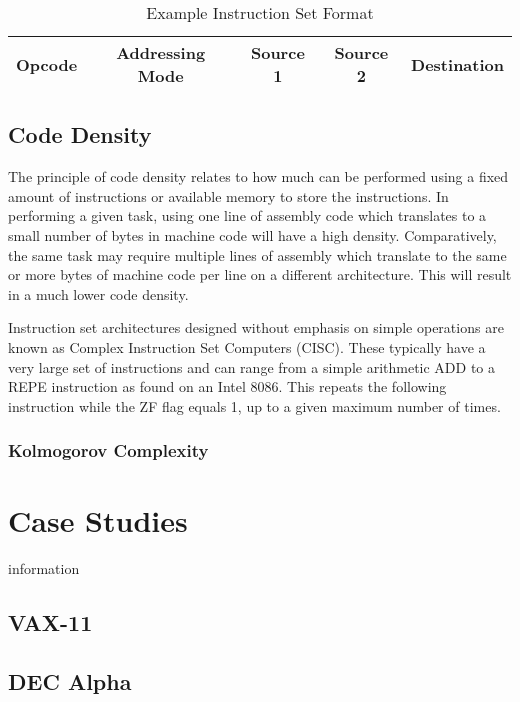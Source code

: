 \documentclass[12pt,a4paper]{article}
\begin{document}


\begin{table}[h]
\centering
\begin{tabular}{|c|c|c|c|c|}
\hline Opcode & Addressing Mode & Source 1 & Source 2 & Destination \\ \hline
\end{tabular}
\caption{\label{tab:ExFormat}Example Instruction Set Format}
\end{table}

\subsection{Code Density}
The principle of code density relates to how much can be performed using a fixed amount of instructions or available memory to store the instructions. In performing a given task, using one line of assembly code which translates to a small number of bytes in machine code will have a high density. Comparatively, the same task may require multiple lines of assembly which translate to the same or more bytes of machine code per line on a different architecture. This will result in a much lower code density. 

Instruction set architectures designed without emphasis on simple operations are known as Complex Instruction Set Computers (CISC). These typically have a very large set of instructions and can range from a simple arithmetic ADD %
to a REPE %
 instruction as found on an Intel 8086. \cite{8086:InstructionSet} 
 This repeats the following instruction while the ZF flag equals 1, up to a given maximum number of times. 

\subsubsection{Kolmogorov Complexity}

\section{Case Studies}
information

\subsection{VAX-11}

\subsection{DEC Alpha}
\end{document}

